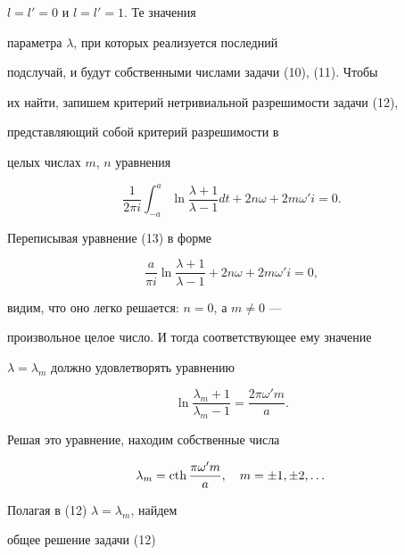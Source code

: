 $l=l'=0$ и $l=l'=1$. Те значения


параметра $\lambda$, при которых реализуется последний


подслучай, и будут собственными числами задачи (10), (11). Чтобы


их найти, запишем критерий нетривиальной разрешимости задачи (12),


представляющий собой критерий разрешимости в


целых числах $m$, $n$ уравнения


\begin{equation}


\dfrac{1}{2\pi i}\int^{a}_{-a}


\ln\dfrac{\lambda+1}{\lambda-1}dt+


2n\omega+2m\omega' i=0.


\end{equation}


Переписывая уравнение (13) в форме


$$


\dfrac{a}{\pi i}\ln\dfrac{\lambda+1}{\lambda-1}+


2n\omega+2m\omega' i=0,


$$


видим, что оно легко решается: $n=0$, а $m\neq 0$ ---


произвольное целое число. И тогда соответствующее ему значение


$\lambda=\lambda_{m}$ должно удовлетворять уравнению


$$


\ln\dfrac{\lambda_{m}+1}{\lambda_{m}-1}=\dfrac{2\pi\omega'm}{a}.


$$


Решая это уравнение, находим собственные числа


$$


\lambda_{m}=\cth\dfrac{\pi \omega' m}{a},\quad m=


\pm 1,\pm 2,\dotsc


$$


Полагая в (12) $\lambda=\lambda_{m}$, найдем


общее решение задачи (12)



